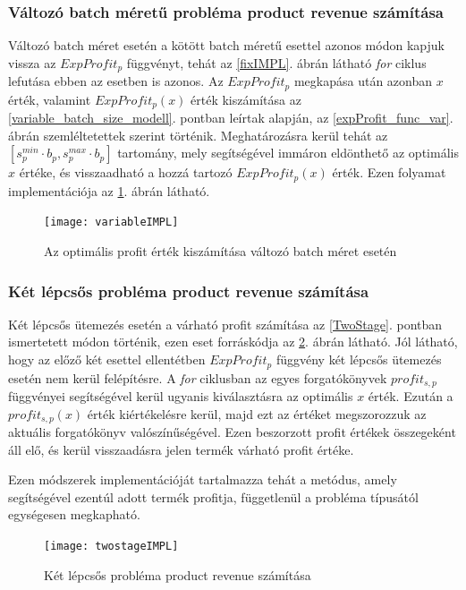 \subsubsection{Változó batch méretű probléma product revenue számítása}
Változó batch méret esetén a kötött batch méretű esettel azonos módon kapjuk vissza az $ExpProfit_p$ függvényt, tehát az \ref{fixIMPL}. ábrán látható \textit{for} ciklus lefutása ebben az esetben is azonos.
Az $ExpProfit_p$ megkapása után azonban $x$ érték, valamint $ExpProfit_p(x)$ érték kiszámítása az \ref{variable_batch_size_modell}. pontban leírtak alapján, az \ref{expProfit_func_var}. ábrán szemléltetettek szerint történik.
Meghatározásra kerül tehát az  $[s_p^{min} \cdot b_p , s_p^{max} \cdot b_p]$ tartomány, mely segítségével immáron eldönthető az optimális $x$ értéke, és visszaadható a hozzá tartozó  $ExpProfit_p(x)$ érték. 
Ezen folyamat implementációja az \ref{variableIMPL}. ábrán látható.
\begin{figure}[H]
\begin{center}
\texttt{[image: variableIMPL]}
\caption{Az optimális profit érték kiszámítása változó batch méret esetén}
\label{variableIMPL}
\end{center}
\end{figure} 
\subsubsection{Két lépcsős probléma product revenue számítása}
Két lépcsős ütemezés esetén a várható profit számítása az \ref{TwoStage}. pontban ismertetett módon történik, ezen eset forráskódja az \ref{twostageIMPL}. ábrán látható.
Jól látható, hogy az előző két esettel ellentétben  $ExpProfit_p$ függvény két lépcsős ütemezés esetén nem kerül felépítésre.
A \textit{for} ciklusban az egyes forgatókönyvek $profit_{s,p}$ függvényei segítségével kerül ugyanis kiválasztásra az optimális $x$ érték.
Ezután a $profit_{s,p}(x)$ érték kiértékelésre kerül, majd ezt az értéket megszorozzuk az aktuális forgatókönyv valószínűségével.
Ezen beszorzott profit értékek összegeként áll elő, és kerül visszaadásra jelen termék várható profit értéke.

Ezen módszerek implementációját tartalmazza tehát a  metódus, amely segítségével ezentúl adott termék profitja, függetlenül a probléma típusától egységesen megkapható.
\begin{figure}[H]
\begin{center}
\texttt{[image: twostageIMPL]}
\caption{Két lépcsős probléma product revenue számítása}
\label{twostageIMPL}
\end{center}
\end{figure} 
